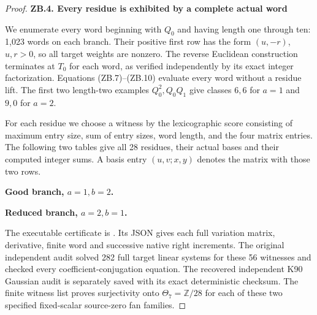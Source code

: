 \begin{proof}
\par

\medskip\noindent\textbf{ZB.4. Every residue is exhibited by a complete actual word}

\par\nopagebreak[4]

We enumerate every word beginning with \(Q_0\) and having length one
through ten: 1,023 words on each branch. Their positive first row has
the form \((u,-r)\), \(u,r>0\), so all target weights are nonzero.
The reverse Euclidean construction terminates at \(T_0\) for each
word, as verified independently by its exact integer factorization.
Equations (ZB.7)--(ZB.10) evaluate every word without a residue lift.
The first two length-two examples \(Q_0^2,Q_0Q_1\) give classes
\(6,6\) for \(a=1\) and \(9,0\) for \(a=2\).

For each residue we choose a witness by the lexicographic score
consisting of maximum entry size, sum of entry sizes, word length,
and the four matrix entries. The following two tables give all 28
residues, their actual bases and their computed integer sums. A basis
entry \((u,v;x,y)\) denotes the matrix with those two rows.

\par

\medskip\noindent\textbf{Good branch, \(a=1,b=2\).}


\par

\medskip\noindent\textbf{Reduced branch, \(a=2,b=1\).}


The executable certificate is
. Its JSON gives each
full variation matrix, derivative, finite word and successive native
right increments. The original independent audit solved 282 full
target linear systems for these 56 witnesses and checked every
coefficient-conjugation equation. The recovered independent K90
Gaussian audit is separately saved with its exact deterministic
checksum. The finite witness list proves surjectivity onto
\(\Theta_7=\mathbb Z/28\) for each of these two specified
fixed-scalar source-zero fan families.

\end{proof}
